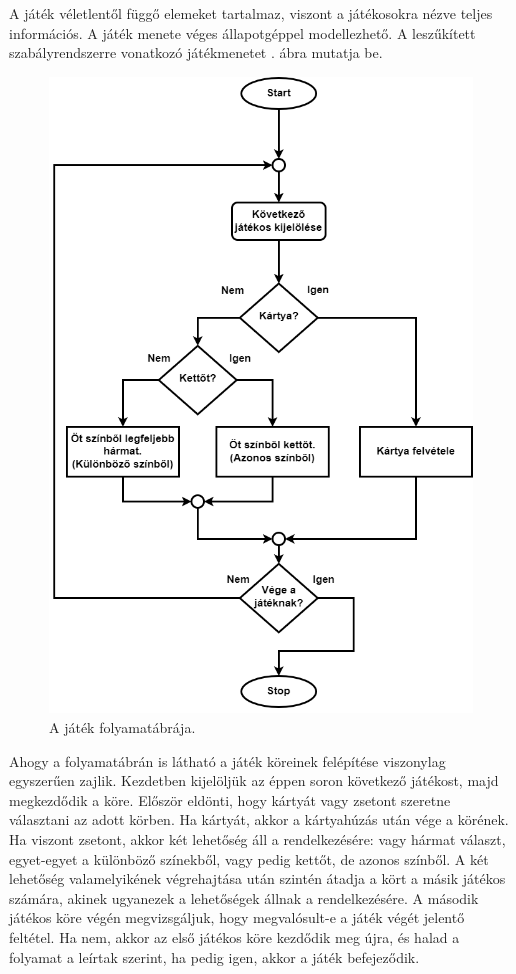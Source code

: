 
A játék véletlentől függő elemeket tartalmaz, viszont a játékosokra nézve teljes információs. A játék menete véges állapotgéppel modellezhető. A leszűkített szabályrendszerre vonatkozó játékmenetet . ábra mutatja be.

\begin{figure}[h]
\centering
\includegraphics[scale=0.42]{images/flowchart.png}
\caption{A játék folyamatábrája.}
\label{fig:flowchart}
\end{figure}

Ahogy a folyamatábrán is látható a játék köreinek felépítése viszonylag egyszerűen zajlik. Kezdetben kijelöljük az éppen soron következő játékost, majd megkezdődik a köre. Először eldönti, hogy kártyát vagy zsetont szeretne választani az adott körben. Ha kártyát, akkor a kártyahúzás után vége a körének. Ha viszont zsetont, akkor két lehetőség áll a rendelkezésére: vagy hármat választ, egyet-egyet a különböző színekből, vagy pedig kettőt, de azonos színből. A két lehetőség valamelyikének végrehajtása után szintén átadja a kört a másik játékos számára, akinek ugyanezek a lehetőségek állnak a rendelkezésére. A második játékos köre végén megvizsgáljuk, hogy megvalósult-e a játék végét jelentő feltétel. Ha nem, akkor az első játékos köre kezdődik meg újra, és halad a folyamat a leírtak szerint, ha pedig igen, akkor a játék befejeződik.

